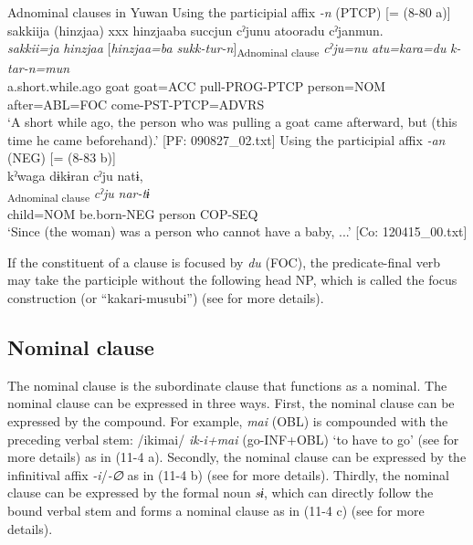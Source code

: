 \ea\label{ex:11-3}  Adnominal clauses in Yuwan
  \ea Using the participial affix \textit{{}-n} (PTCP) [= (8-80 a)]
   \glll sakkiija  (hinzjaa)  xxx  hinzjaaba  succjun cˀjunu  atooradu  cˀjanmun.\\
    \textit{sakkii=ja}  \textit{hinzjaa}    [\textit{hinzjaa=ba}  \textit{sukk-tur-n}]\textsubscript{Adnominal clause}   \textit{cˀju=nu}  \textit{atu=kara=du}  \textit{k-tar-n=mun}\\
    a.short.while.ago  goat    goat=ACC  pull-PROG-PTCP  person=NOM  after=ABL=FOC  come-PST-PTCP=ADVRS\\
   \glt ‘A short while ago, the person who was pulling a goat came afterward, but (this time he came beforehand).’    [PF: 090827\_02.txt]
  \ex Using the participial affix \textit{{}-an} (NEG) [= (8-83 b)]\\
   \glll kˀwaga  dɨkɨran  cˀju  natɨ,\\
    [\textit{kˀwa=ga}  \textit{dɨkɨr-an}]\textsubscript{Adnominal clause}  \textit{cˀju}  \textit{nar-tɨ}\\
    child=NOM  be.born-NEG  person  COP-SEQ\\
    ‘Since (the woman) was a person who cannot have a baby, ...’    [Co: 120415\_00.txt]
\z
\z

If the constituent of a clause is focused by \textit{du} (FOC), the predicate-final verb may take the participle without the following head NP, which is called the focus construction (or “kakari-musubi”) (see  for more details).

\subsection{Nominal clause}\label{sec:11.1.3}

The nominal clause is the subordinate clause that functions as a nominal. The nominal clause can be expressed in three ways. First, the nominal clause can be expressed by the compound. For example, \textit{mai} (OBL) is compounded with the preceding verbal stem: /ikimai/ \textit{ik-i+mai} (go-INF+OBL) ‘to have to go’ (see  for more details) as in (11-4 a). Secondly, the nominal clause can be expressed by the infinitival affix \textit{{}-i}/\textit{{}-∅} as in (11-4 b) (see  for more details). Thirdly, the nominal clause can be expressed by the formal noun \textit{sɨ}, which can directly follow the bound verbal stem and forms a nominal clause as in (11-4 c) (see  for more details).

